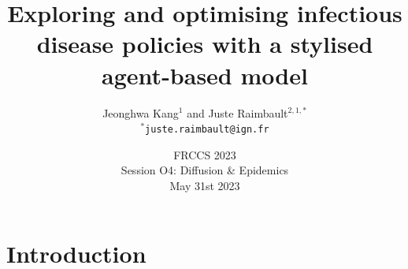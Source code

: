 






\title[ABM for infectious disease policies]{Exploring and optimising infectious disease policies with a stylised agent-based model}

\author[Kang and Raimbault]{Jeonghwa Kang$^1$ and Juste Raimbault$^{2,1,\ast}$\\\medskip
$^{\ast}$\texttt{juste.raimbault@ign.fr}
}



\date[31/05/2023]{FRCCS 2023\\
Session O4: Diffusion \& Epidemics\\
May 31st 2023
}

\frame{\maketitle}



\section{Introduction}


